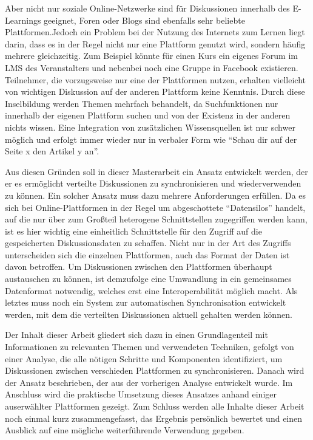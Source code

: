 Aber nicht nur soziale Online-Netzwerke sind für Diskussionen innerhalb des E-Learnings geeignet, Foren oder Blogs sind ebenfalls sehr beliebte Plattformen.Jedoch ein Problem bei der Nutzung des Internets zum Lernen liegt darin, dass es in der Regel nicht nur eine Plattform genutzt wird, sondern häufig mehrere gleichzeitig. Zum Beispiel könnte für einen Kurs ein eigenes Forum im LMS des Veranstalters und nebenbei noch eine Gruppe in Facebook existieren. Teilnehmer, die vorzugsweise nur eine der Plattformen nutzen, erhalten vielleicht von wichtigen Diskussion auf der anderen Plattform keine Kenntnis. Durch diese Inselbildung werden Themen mehrfach behandelt, da Suchfunktionen nur innerhalb der eigenen Plattform suchen und von der Existenz in der anderen nichts wissen. Eine Integration von zusätzlichen Wissensquellen ist nur schwer möglich und erfolgt immer wieder nur in verbaler Form wie \enquote{Schau dir auf der Seite x den Artikel y an}.

Aus diesen Gründen soll in dieser Masterarbeit ein Ansatz entwickelt werden, der er es ermöglicht verteilte Diskussionen zu synchronisieren und wiederverwenden zu können. Ein solcher Ansatz muss dazu mehrere Anforderungen erfüllen. Da es sich bei Online-Plattformen in der Regel um abgeschottete \enquote{Datensilos}\cite{Berners-Lee2011} handelt, auf die nur über zum Großteil heterogene Schnittstellen zugegriffen werden kann, ist es hier wichtig eine einheitlich Schnittstelle für den Zugriff auf die gespeicherten Diskussionsdaten zu schaffen. Nicht nur in der Art des Zugriffs unterscheiden sich die einzelnen Plattformen, auch das Format der Daten ist davon betroffen. Um Diskussionen zwischen den Plattformen überhaupt austauschen zu können, ist demzufolge eine Umwandlung in ein gemeinsames Datenformat notwendig, welches erst eine Interoperabilität möglich macht. Als letztes muss noch ein System zur automatischen Synchronisation entwickelt werden, mit dem die verteilten Diskussionen aktuell gehalten werden können.

Der Inhalt dieser Arbeit gliedert sich dazu in einen Grundlagenteil mit Informationen zu relevanten Themen und verwendeten Techniken, gefolgt von einer Analyse, die alle nötigen Schritte und Komponenten identifiziert, um Diskussionen zwischen verschieden Plattformen zu synchronisieren. Danach wird der Ansatz beschrieben, der aus der vorherigen Analyse entwickelt wurde. Im Anschluss wird die praktische Umsetzung dieses Ansatzes anhand einiger auserwählter Plattformen gezeigt. Zum Schluss werden alle Inhalte dieser Arbeit noch einmal kurz zusammengefasst, das Ergebnis persönlich bewertet und einen Ausblick auf eine mögliche weiterführende Verwendung gegeben.


